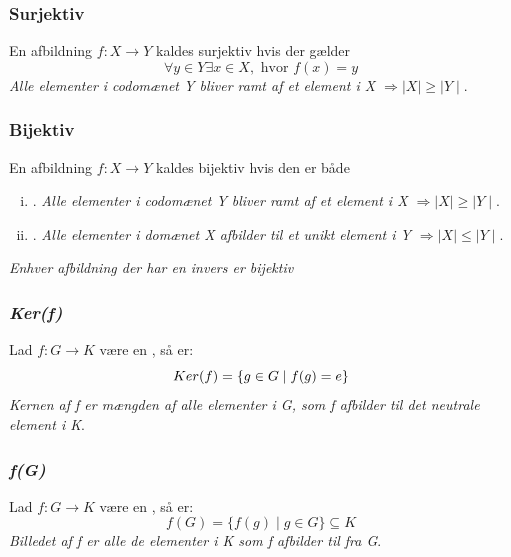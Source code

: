 \subsubsection{Surjektiv}
\label{Surjektiv}
En afbildning $f: X \to Y$ kaldes surjektiv hvis der gælder
\begin{equation*}
  \forall y \in Y \exists x \in X, \text{ hvor } f(x) = y
\end{equation*}
\textit{Alle elementer i codomænet Y bliver ramt af et element i X $\Rightarrow
\mid X \mid \geq \mid Y\mid$}.

\subsubsection{Bijektiv}
\label{Bijektiv}
En afbildning $f: X \to Y$ kaldes bijektiv hvis den er både
\begin{enumerate}[(i)]
  \item {}. \textit{Alle elementer i codomænet Y bliver ramt af
  et element i X $\Rightarrow \mid X\mid \geq \mid Y\mid$}.  
  \item {}. \textit{Alle elementer i domænet X afbilder til et
  unikt element i Y $\Rightarrow \mid X\mid \leq \mid Y\mid$}.
\end{enumerate}
\textit{Enhver afbildning der har en invers er bijektiv}

\subsubsection{\textit{Ker(f)}}
\label{Ker(f)}
Lad $f: G \rightarrow K$ være en , så er:
\begin{equation*}
  Ker(f) = \{ g \in G \mid f(g) = e \}
\end{equation*}
\textit{Kernen af f er mængden af alle elementer i G, som f afbilder til det
neutrale element i K}.

\subsubsection{\textit{f(G)}}
Lad $f: G \rightarrow K$ være en , så er:
\label{f(G)}
\begin{equation*}
  f(G) = \{f(g) \mid g \in G\} \subseteq K
\end{equation*}
\textit{Billedet af f er alle de elementer i K som f afbilder til fra G}.

